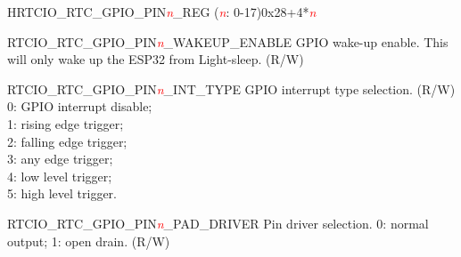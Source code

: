 \begin{register}{H}{RTCIO\_RTC\_GPIO\_PIN\textcolor{red}{\it{n}}\_REG (\textcolor{red}{\it{n}}: 0-17)}{0x28+4*\textcolor{red}{\it{n}}}\label{regdesc:RTCIORTCGPIOPINnREG}
%
%
%
%
%
%
\regnewline%
\begin{regdesc}\begin{reglist}
\item [RTCIO\_RTC\_GPIO\_PIN\textcolor{red}{\it{n}}\_WAKEUP\_ENABLE]GPIO wake-up enable. This will only wake up the ESP32 from Light-sleep. (R/W)
\item [RTCIO\_RTC\_GPIO\_PIN\textcolor{red}{\it{n}}\_INT\_TYPE]GPIO interrupt type selection. (R/W) \\0: GPIO interrupt disable; \\1: rising edge trigger; \\2: falling edge trigger; \\3: any edge trigger; \\4: low level trigger; \\5: high level trigger.
\item [RTCIO\_RTC\_GPIO\_PIN\textcolor{red}{\it{n}}\_PAD\_DRIVER]Pin driver selection. 0: normal output; 1: open drain. (R/W)
\end{reglist}\end{regdesc}
\end{register}

